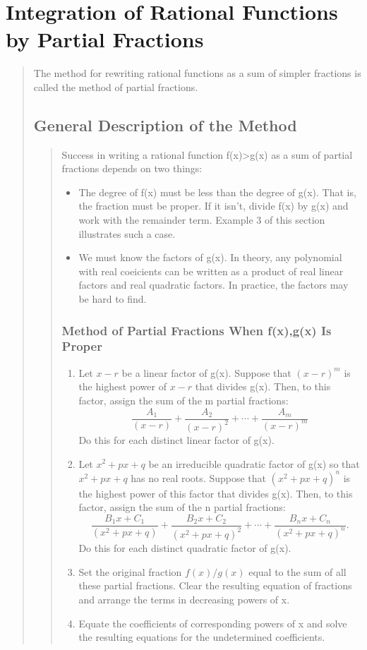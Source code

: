 \documentclass{report}
\begin{document}
\section{Integration of Rational Functions by Partial Fractions}
\begin{quote}

	The method for rewriting rational functions as a sum of simpler fractions is called the method of partial fractions.

	\subsection{General Description of the Method}
	\begin{quote}

		Success in writing a rational function ƒ(x)>g(x) as a sum of partial fractions depends on two things:

		\begin{itemize}
			\item The degree of ƒ(x) must be less than the degree of g(x). That is, the fraction must be proper. If it isn’t, divide ƒ(x) by g(x) and work with the remainder term. Example 3 of this section illustrates such a case.
			\item We must know the factors of g(x). In theory, any polynomial with real coeicients can be written as a product of real linear factors and real quadratic factors. In practice, the factors may be hard to find.
		\end{itemize}
		
		\subsubsection{Method of Partial Fractions When ƒ(x),g(x) Is Proper}
		\begin{enumerate}
			\item Let $x-r$ be a linear factor of g(x). Suppose that $(x-r)^m$ is the highest power of $x - r$ that divides g(x). Then, to this factor, assign the sum of the m partial fractions: $$\frac{A_1}{(x-r)}+\frac{A_2}{(x-r)^2}+\cdots+\frac{A_m}{(x-r)^m}$$ Do this for each distinct linear factor of g(x).
			\item Let $x^2 + px + q$ be an irreducible quadratic factor of g(x) so that $x^2 + px + q$ has no real roots. Suppose that $(x^2 + px + q)^n$ is the highest power of this factor that divides g(x). Then, to this factor, assign the sum of the n partial fractions: $$\frac{B_1x + C_1}{(x^2+px+q)}+\frac{B_2x+C_2}{(x^2+px+q)^2}+\cdots+\frac{B_nx+C_n}{(x^2+px+q)^n}.$$ Do this for each distinct quadratic factor of g(x).
			\item Set the original fraction $f(x)/g(x)$ equal to the sum of all these partial fractions. Clear the resulting equation of fractions and arrange the terms in decreasing powers of x.
			\item Equate the coefficients of corresponding powers of x and solve the resulting equations for the undetermined coefficients.
		\end{enumerate}
	
	\end{quote}

\end{quote}
\end{document}
